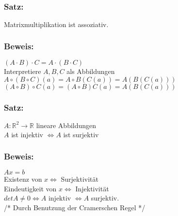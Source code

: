 \subsubsection{Satz:}
Matrixmultiplikation ist assoziativ.
%
%
%
\subsubsection{Beweis:} 
$(A\cdot B) \cdot C = A \cdot (B \cdot C)$ \\
Interpretiere $A,B,C$ als Abbildungen\\
$A\circ (B \circ C) (a) = A\circ B (C(a)) = A(B(C(a)))$\\
$(A\circ B) \circ C (a)=(A\circ B)C(a)=A(B(C(a)))$
%
%
%
\subsubsection{Satz:}
$A: \mathbb{R}^{2} \rightarrow \mathbb{R}$ lineare Abbildungen\\
$A$ ist injektiv $\Leftrightarrow A$ ist surjektiv
%
%
%
\subsubsection{Beweis:}
$Ax=b$ \\
Existenz von $x \Leftrightarrow$ Surjektivität\\
Eindeutigkeit von $x \Leftrightarrow$ Injektivität\\
$det A \neq 0 \Leftrightarrow A$ injektiv $\Leftrightarrow A$ surjektiv. \\
/* Durch Benutzung der Cramerschen Regel */